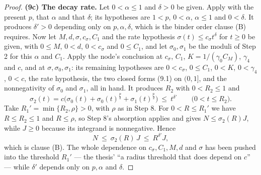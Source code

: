 \begin{proof}
\textbf{(9c) The decay rate.}  Let $0<\alpha\le1$ and $\delta>0$ be given.
Apply  with the present $p$, that $\alpha$
and that $\delta$; its hypotheses are $1<p$, $0<\alpha$, $\alpha\le1$ and
$0<\delta$.  It produces $\delta'>0$ depending only on $p,\alpha,\delta$, which
is the binder order clause (B) requires.  Now let $M,d,\sigma,c_\sigma,C_1$ and
the rate hypothesis $\sigma(t)\le c_\sigma t^{\delta}$ for $t\ge0$ be given,
with $0\le M$, $0<d$, $0<c_\sigma$ and $0\le C_1$, and let $\sigma_0,\sigma_1$
be the moduli of Step 2 for this $\alpha$ and $C_1$.  Apply the node's
conclusion at $c_\sigma$, $C_1$, $K=1/(\gamma_0C_M)$, $\gamma_4$ and $c$, and at
$\sigma,\sigma_0,\sigma_1$: its remaining hypotheses are $0<c_\sigma$,
$0\le C_1$, $0<K$, $0<\gamma_4$, $0<c$, the rate hypothesis, the two closed
forms (9.1) on $(0,1]$, and the nonnegativity of $\sigma_0$ and $\sigma_1$, all
in hand.  It produces $R_2$ with $0<R_2\le1$ and
\[
\sigma_2(t)=c\bigl(\sigma_0(t)+\sigma_0(t)^{\frac p2}
+\sigma_1(t)^{\frac p2}\bigr)\ \le\ t^{\delta'}
\qquad\bigl(0<t\le R_2\bigr).
\]
Take $R_1'=\min\{R_2,\rho\}>0$, with $\rho$ as in Step 8.  For $0<R\le R_1'$ we
have $R\le R_2\le1$ and $R\le\rho$, so Step 8's absorption applies and gives
$N\le\sigma_2(R)J$, while $J\ge0$ because its integrand is nonnegative.  Hence
\[
N\ \le\ \sigma_2(R)\,J\ \le\ R^{\delta'}J ,
\]
which is clause (B).  The whole dependence on $c_\sigma,C_1,M,d$ and $\sigma$ has
been pushed into the threshold $R_1'$ --- the thesis' ``a radius threshold that
does depend on $c$'' --- while $\delta'$ depends only on $p,\alpha$ and
$\delta$.
\end{proof}
